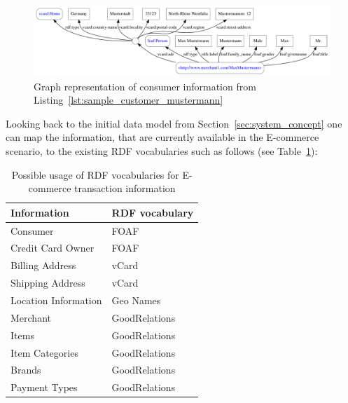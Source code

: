 
\begin{figure}[H]
	\centering
		\includegraphics[width=\columnwidth]{images/sample_customer_mustermann.pdf}
	\caption{Graph representation of consumer information from Listing~\ref{lst:sample_customer_mustermann}}
\label{fig:images_sample_customer}
\end{figure}

Looking back to the initial data model from Section~\ref{sec:system_concept} one can map the information, that are currently available in the \gls{E-commerce} scenario, to the existing \gls{RDF} vocabularies such as follows (see Table~\ref{tab:map_tx_rdf_vocab}):\@

\begin{table}[H]
\centering
\begin{tabular}{p{5cm}l}
\hline
\textbf{Information} & \textbf{RDF vocabulary} \\
\hline
Consumer & FOAF \\
\hline
Credit Card Owner & FOAF \\
\hline
Billing Address & vCard \\
\hline
Shipping Address & vCard \\
\hline
Location Information & Geo Names \\
\hline
Merchant & GoodRelations \\
\hline
Items & GoodRelations \\
\hline
Item Categories & GoodRelations \\
\hline
Brands & GoodRelations \\
\hline
Payment Types & GoodRelations \\
\hline
\end{tabular}
\caption{Possible usage of \gls{RDF} vocabularies for \gls{E-commerce} transaction information}
\label{tab:map_tx_rdf_vocab}
\end{table}

